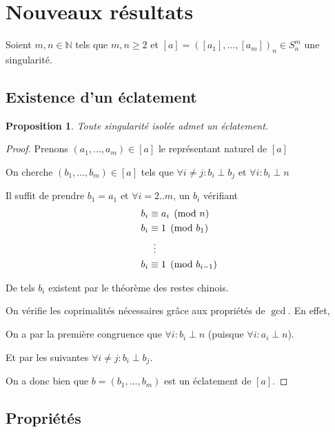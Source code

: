 \documentclass{article}
\newtheorem{proposition}{Proposition}
\begin{document}
\newpage

\section{Nouveaux résultats}

Soient $m, n \in \mathbb{N}$ tels que $m, n \geq 2$ et $[a] = {([a_1], \dots, [a_m])}_n \in S_n^m$ une singularité.

\subsection{Existence d'un éclatement}

\begin{proposition}
    Toute singularité isolée admet un éclatement.
\end{proposition}

\begin{proof}
    Prenons $(a_1, \dots, a_m) \in [a]$ le représentant naturel de $[a]$

    On cherche $(b_1, \dots, b_m) \in [a]$ tels que $\forall i \neq j : b_i \perp b_j$ et $\forall i : b_i \perp n$

    Il suffit de prendre $b_1 = a_1$ et $\forall i = 2..m$, un $b_i$ vérifiant
    \begin{align*}
        b_i & \equiv a_i \pmod n \\
        b_i & \equiv 1 \pmod {b_1} \\
            & \vdotswithin{\equiv} \\
        b_i & \equiv 1 \pmod {b_{i-1}}
    \end{align*}

    De tels $b_i$ existent par le théorème des restes chinois.

    On vérifie les coprimalités nécessaires grâce aux propriétés de $\gcd$. En effet,
    
    \hspace{\parindent} On a par la première congruence que $\forall i : b_i \perp n$ (puisque $\forall i : a_i \perp n$).

    \hspace{\parindent} Et par les suivantes $\forall i \neq j : b_i \perp b_j$.

    On a donc bien que $b = (b_1, \dots, b_m)$ est un éclatement de $[a]$.
\end{proof}

\subsection{Propriétés}
\end{document}
